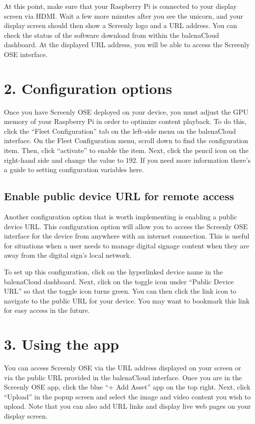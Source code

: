 At this point, make sure that your Raspberry Pi is connected to your display screen via HDMI. Wait a few more minutes after you see the unicorn, and your display screen should then show a Screenly logo and a URL address. You can check the status of the software download from within the balenaCloud dashboard. At the displayed URL address, you will be able to access the Screenly OSE interface. 

\section*{2. Configuration options}

Once you have Screenly OSE deployed on your device, you must adjust the GPU memory of your Raspberry Pi in order to optimize content playback. To do this, click the “Fleet Configuration” tab on the left-side menu on the balenaCloud interface. On the Fleet Configuration menu, scroll down to find the  configuration item. Then, click “activate” to enable the item. Next, click the pencil icon on the right-hand side and change the value to 192. If you need more information there's a guide to setting configuration variables here.

\subsection*{Enable public device URL for remote access}

Another configuration option that is worth implementing is enabling a public device URL. This configuration option will allow you to access the Screenly OSE interface for the device from anywhere with an internet connection. This is useful for situations when a user needs to manage digital signage content when they are away from the digital sign’s local network.

To set up this configuration, click on the hyperlinked device name in the balenaCloud dashboard. Next, click on the toggle icon under “Public Device URL” so that the toggle icon turns green. You can then click the link icon to navigate to the public URL for your device. You may want to bookmark this link for easy access in the future. 

\section*{3. Using the app}

You can access Screenly OSE via the URL address displayed on your screen or via the public URL provided in the balenaCloud interface. Once you are in the Screenly OSE app, click the blue “+ Add Asset” app on the top right. Next, click “Upload” in the popup screen and select the image and video content you wish to upload. Note that you can also add URL links and display live web pages on your display screen.